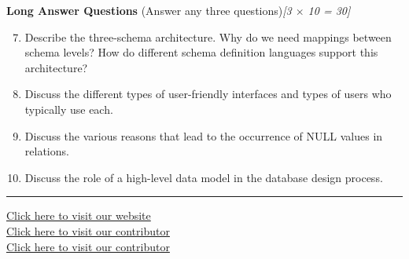\documentclass[11pt,a4paper]{article}
\newcommand{\pts}[1]{\hfill   \textit{[#1]}}
\begin{document}
\noindent   \textbf{Long Answer Questions} (Answer any three questions)\pts{3 $ \times$ 10 = 30}

\begin{enumerate}[label=\arabic*.,leftmargin=*,itemsep=12pt]
  \setcounter{enumi}{6}
  \item Describe the three-schema architecture. Why do we need mappings between schema levels? How do different schema definition languages support this architecture?
  \item Discuss the different types of user-friendly interfaces and types of users who typically use each.
  \item Discuss the various reasons that lead to the occurrence of NULL values in relations.
  \item Discuss the role of a high-level data model in the database design process.
\end{enumerate}

\vfill
\rule{\linewidth}{0.4pt}

\begin{center}\small
\href{https://bhu-exam.vercel.app/}{Click here to visit our website}\\[4pt]\href{https://me-aryan.vercel.app/}{Click here to visit our contributor}\\[4pt]\href{https://quashan-me.vercel.app/}{Click here to visit our contributor}
\end{center}
\end{document}
